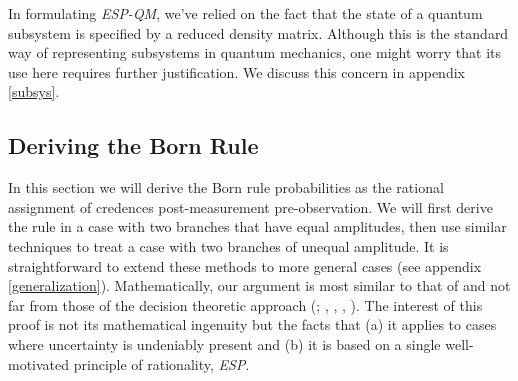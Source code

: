\documentclass[12pt,onecolumn,secnumarabic,amsmath,amssymb,balancelastpage,nofootinbib]{article}
\begin{document}
In formulating \emph{ESP-QM}, we've relied on the fact that the state of a quantum subsystem is specified by a reduced density matrix.  Although this is the standard way of representing subsystems in quantum mechanics, one might worry that its use here requires further justification.  We discuss this concern in appendix \ref{subsys}.

\subsection{Deriving the Born Rule}\label{prf}

In this section we will derive the Born rule probabilities as the rational assignment of credences post-measurement pre-observation.  We will first derive the rule in a case with two branches that have equal amplitudes, then use similar techniques to treat a case with two branches of unequal amplitude.  It is straightforward to extend these methods to more general cases (see appendix \ref{generalization}). Mathematically, our argument is most similar to that of \citet{zurek2005} and not far from those of the decision theoretic approach (\citealp{deutsch1999}; \citeauthor{wallace2003b}, \citeyear{wallace2003b}, \citeyear{wallace2010b}, \citeyear{wallace2012}).  The interest of this proof is not its mathematical ingenuity but the facts that (a) it applies to cases where uncertainty is undeniably present and (b) it is based on a single well-motivated principle of rationality, \emph{ESP}.
\end{document}

